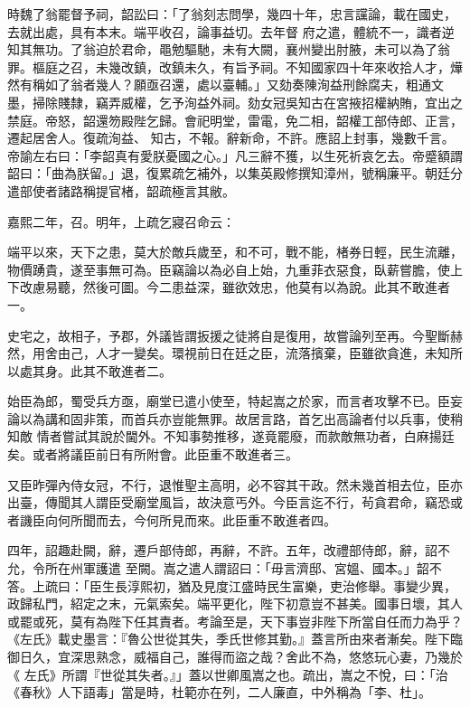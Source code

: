 \begin{pinyinscope}
 時魏了翁罷督予祠，韶訟曰：「了翁刻志問學，幾四十年，忠言讜論，載在國史，去就出處，具有本末。端平收召，論事益切。去年督
 府之遣，體統不一，識者逆知其無功。了翁迫於君命，黽勉驅馳，未有大闕，襄州變出肘腋，未可以為了翁罪。樞庭之召，未幾改鎮，改鎮未久，有旨予祠。不知國家四十年來收拾人才，燁然有稱如了翁者幾人？願亟召還，處以臺輔。」又劾奏陳洵益刑餘腐夫，粗通文墨，掃除賤隸，竊弄威權，乞予洵益外祠。劾女冠吳知古在宮掖招權納賄，宜出之禁庭。帝怒，韶還笏殿陛乞歸。會祀明堂，雷電，免二相，韶權工部侍郎、正言，遷起居舍人。復疏洵益、
 知古，不報。辭新命，不許。應詔上封事，幾數千言。帝諭左右曰：「李韶真有愛朕憂國之心。」凡三辭不獲，以生死祈哀乞去。帝蹙額謂韶曰：「曲為朕留。」退，復累疏乞補外，以集英殿修撰知漳州，號稱廉平。朝廷分遣部使者諸路稱提官楮，韶疏極言其敝。



 嘉熙二年，召。明年，上疏乞寢召命云：



 端平以來，天下之患，莫大於敵兵歲至，和不可，戰不能，楮券日輕，民生流離，物價踴貴，遂至事無可為。臣竊論以為必自上始，九重菲衣惡食，臥薪嘗膽，使上
 下改慮易聽，然後可圖。今二患益深，雖欲效忠，他莫有以為說。此其不敢進者一。



 史宅之，故相子，予郡，外議皆謂扳援之徒將自是復用，故嘗論列至再。今聖斷赫然，用舍由己，人才一變矣。環視前日在廷之臣，流落擯棄，臣雖欲貪進，未知所以處其身。此其不敢進者二。



 始臣為郎，蜀受兵方亟，廟堂已遣小使至，特起嵩之於家，而言者攻擊不已。臣妄論以為講和固非策，而首兵亦豈能無罪。故居言路，首乞出高論者付以兵事，使稍知敵
 情者嘗試其說於閫外。不知事勢推移，遂竟罷廢，而款敵無功者，白麻揚廷矣。或者將議臣前日有所附會。此臣重不敢進者三。



 又臣昨彈內侍女冠，不行，退惟聖主高明，必不容其干政。然未幾首相去位，臣亦出臺，傳聞其人謂臣受廟堂風旨，故決意丐外。今臣言迄不行，茍貪君命，竊恐或者譏臣向何所聞而去，今何所見而來。此臣重不敢進者四。



 四年，詔趣赴闕，辭，遷戶部侍郎，再辭，不許。五年，改禮部侍郎，辭，詔不允，令所在州軍護遣
 至闕。嵩之遣人謂詔曰：「毋言濟邸、宮媼、國本。」韶不答。上疏曰：「臣生長淳熙初，猶及見度江盛時民生富樂，吏治修舉。事變少異，政歸私門，紹定之末，元氣索矣。端平更化，陛下初意豈不甚美。國事日壞，其人或罷或死，莫有為陛下任其責者。考論至是，天下事豈非陛下所當自任而力為乎？《左氏》載史墨言：『魯公世從其失，季氏世修其勤。』蓋言所由來者漸矣。陛下臨御日久，宜深思熟念，威福自己，誰得而盜之哉？舍此不為，悠悠玩心妻，乃幾於《
 左氏》所謂『世從其失者。』」蓋以世卿風嵩之也。疏出，嵩之不悅，曰：「治《春秋》人下語毒」當是時，杜範亦在列，二人廉直，中外稱為「李、杜」。




\end{pinyinscope}
